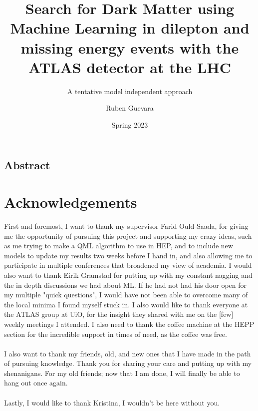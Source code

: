 \documentclass[12pt, a4paper]{book}
\title{Search for Dark Matter using Machine Learning in dilepton and missing energy events with the ATLAS detector at the LHC}
\subtitle{A tentative model independent approach}
\author{Ruben Guevara}
\date{Spring 2023}
\begin{document}

\uiomasterfp[
colour = pink,
dept = {Department of Physics},
long,
program = {Physics: Nuclear and Particle Physics},
supervisors = {Professor Farid Ould-Saada \and Dr. Eirik Gramstad},
]

\newpage
\begin{center}
\section*{Abstract}
\end{center}
	


\newpage
\section*{Acknowledgements}
First and foremost, I want to thank my supervisor Farid Ould-Saada, for giving me the opportunity of pursuing this project and supporting my crazy ideas, such as me trying to make a QML algorithm to use in HEP, 
and to include new models to update my results two weeks before I hand in, and also allowing me to participate in multiple conferences that broadened my view of academia.
I would also want to thank Eirik Gramstad for putting up with my constant nagging and the in depth discussions we had about ML. If he had not had his door open for my multiple "quick questions", I would have not
been able to overcome many of the local minima I found myself stuck in. I also would like to thank everyone at the ATLAS group at UiO, for the insight they shared with me on the [few] weekly meetings I attended. 
I also need to thank the coffee machine at the HEPP section for the incredible support in times of need, as the coffee was free. \\
\\I also want to thank my friends, old, and new ones that I have made in the path of pursuing knowledge. Thank you for sharing your care and putting up with my shenanigans. 
For my old friends; now that I am done, I will finally be able to hang out once again.\\
\\Lastly, I would like to thank Kristina, I wouldn't be here without you.

\newpage
\end{document}
